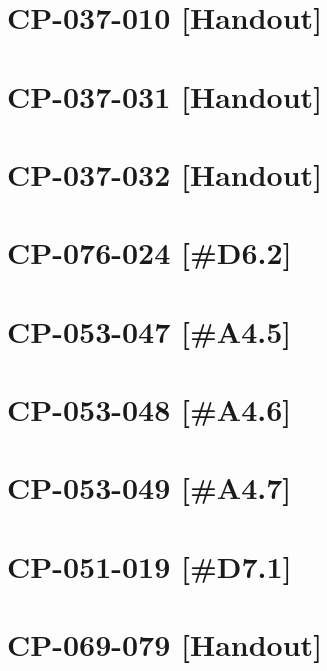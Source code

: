 \section{CP-037-010 [Handout]}\newpage
\section{CP-037-031 [Handout]}\newpage
\section{CP-037-032 [Handout]}\newpage
\section{CP-076-024 [\#D6.2]}\newpage

\setcounter{section}{0}

\section{CP-053-047 [\#A4.5]}\newpage
\section{CP-053-048 [\#A4.6]}\newpage
\section{CP-053-049 [\#A4.7]}\newpage
\section{CP-051-019 [\#D7.1]}\newpage
\section{CP-069-079 [Handout]}
